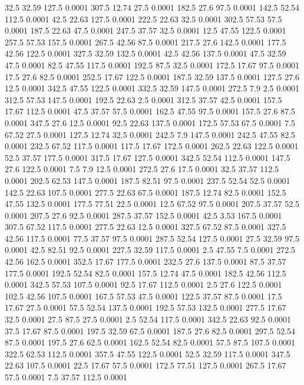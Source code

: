 32.5	32.59	127.5	0.0001
307.5	12.74	27.5	0.0001
182.5	27.6	97.5	0.0001
142.5	52.54	112.5	0.0001
42.5	22.63	127.5	0.0001
222.5	22.63	32.5	0.0001
302.5	57.53	57.5	0.0001
187.5	22.63	47.5	0.0001
247.5	37.57	32.5	0.0001
12.5	47.55	122.5	0.0001
257.5	57.53	157.5	0.0001
267.5	42.56	87.5	0.0001
217.5	27.6	142.5	0.0001
177.5	42.56	122.5	0.0001
327.5	32.59	132.5	0.0001
42.5	42.56	137.5	0.0001
47.5	32.59	47.5	0.0001
82.5	47.55	117.5	0.0001
192.5	87.5	32.5	0.0001
172.5	17.67	97.5	0.0001
17.5	27.6	82.5	0.0001
252.5	17.67	122.5	0.0001
187.5	32.59	137.5	0.0001
127.5	27.6	12.5	0.0001
342.5	47.55	122.5	0.0001
332.5	32.59	147.5	0.0001
272.5	7.9	2.5	0.0001
312.5	57.53	147.5	0.0001
192.5	22.63	2.5	0.0001
312.5	37.57	42.5	0.0001
157.5	17.67	112.5	0.0001
47.5	37.57	57.5	0.0001
162.5	47.55	97.5	0.0001
157.5	27.6	87.5	0.0001
347.5	27.6	12.5	0.0001
92.5	22.63	137.5	0.0001
172.5	57.53	67.5	0.0001
7.5	67.52	27.5	0.0001
127.5	12.74	32.5	0.0001
242.5	7.9	147.5	0.0001
242.5	47.55	82.5	0.0001
232.5	67.52	117.5	0.0001
117.5	17.67	172.5	0.0001
262.5	22.63	122.5	0.0001
52.5	37.57	177.5	0.0001
317.5	17.67	127.5	0.0001
342.5	52.54	112.5	0.0001
147.5	27.6	122.5	0.0001
7.5	7.9	12.5	0.0001
272.5	27.6	17.5	0.0001
32.5	37.57	112.5	0.0001
202.5	62.53	147.5	0.0001
187.5	82.51	97.5	0.0001
237.5	52.54	52.5	0.0001
142.5	22.63	107.5	0.0001
277.5	22.63	67.5	0.0001
187.5	12.74	82.5	0.0001
152.5	47.55	132.5	0.0001
177.5	77.51	22.5	0.0001
12.5	67.52	97.5	0.0001
207.5	37.57	52.5	0.0001
207.5	27.6	92.5	0.0001
287.5	37.57	152.5	0.0001
42.5	3.53	167.5	0.0001
307.5	67.52	117.5	0.0001
277.5	22.63	12.5	0.0001
327.5	67.52	87.5	0.0001
327.5	42.56	117.5	0.0001
77.5	37.57	97.5	0.0001
287.5	52.54	127.5	0.0001
27.5	32.59	97.5	0.0001
42.5	82.51	92.5	0.0001
227.5	32.59	117.5	0.0001
2.5	47.55	7.5	0.0001
272.5	42.56	162.5	0.0001
352.5	17.67	177.5	0.0001
232.5	27.6	137.5	0.0001
87.5	37.57	177.5	0.0001
192.5	52.54	82.5	0.0001
157.5	12.74	47.5	0.0001
182.5	42.56	112.5	0.0001
342.5	57.53	107.5	0.0001
92.5	17.67	112.5	0.0001
2.5	27.6	122.5	0.0001
102.5	42.56	107.5	0.0001
167.5	57.53	47.5	0.0001
122.5	37.57	87.5	0.0001
17.5	17.67	27.5	0.0001
57.5	52.54	137.5	0.0001
192.5	57.53	132.5	0.0001
277.5	17.67	32.5	0.0001
27.5	87.5	27.5	0.0001
2.5	52.54	117.5	0.0001
342.5	22.63	92.5	0.0001
37.5	17.67	87.5	0.0001
197.5	32.59	67.5	0.0001
187.5	27.6	82.5	0.0001
297.5	52.54	87.5	0.0001
197.5	27.6	62.5	0.0001
162.5	52.54	82.5	0.0001
57.5	87.5	107.5	0.0001
322.5	62.53	112.5	0.0001
357.5	47.55	122.5	0.0001
52.5	32.59	117.5	0.0001
347.5	22.63	107.5	0.0001
22.5	17.67	57.5	0.0001
172.5	77.51	127.5	0.0001
267.5	17.67	57.5	0.0001
7.5	37.57	112.5	0.0001

